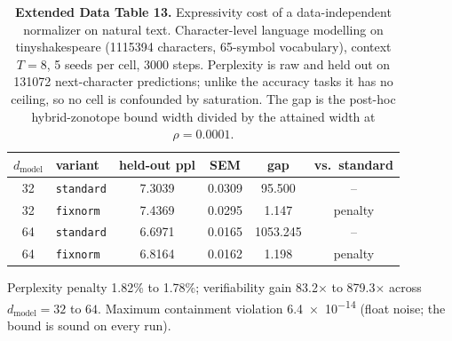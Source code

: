 \documentclass[sn-nature,pdflatex]{sn-jnl}
\begin{document}
\begin{table}[t]
\centering
\caption*{\textbf{Extended Data Table 13.} Expressivity cost of a data-independent normalizer on natural text. Character-level language modelling on tinyshakespeare (\num{1115394} characters, 65-symbol vocabulary), context $T=8$, 5 seeds per cell, 3000 steps. Perplexity is raw and held out on \num{131072} next-character predictions; unlike the accuracy tasks it has no ceiling, so no cell is confounded by saturation. The gap is the post-hoc hybrid-zonotope bound width divided by the attained width at $\rho=\num{0.0001}$.}
\label{edtab:language}
\begin{tabular}{S[table-format=2.0] l S[table-format=2.4] S[table-format=1.4] S[table-format=4.3] c}
\toprule
{$d_{\text{model}}$} & variant & {held-out ppl} & {SEM} & {gap} & {vs.\ standard} \\
 & \texttt{standard} & 7.3039 & 0.0309 & 95.500 & {--} \\
32 & \texttt{fixnorm} & 7.4369 & 0.0295 & 1.147 & penalty \\
64 & \texttt{standard} & 6.6971 & 0.0165 & 1053.245 & {--} \\
64 & \texttt{fixnorm} & 6.8164 & 0.0162 & 1.198 & penalty \\
\bottomrule
\end{tabular}
\par\vspace{2pt}\noindent\footnotesize Perplexity penalty \num{1.82}\% to \num{1.78}\%; verifiability gain \num{83.2}$\times$ to \num{879.3}$\times$ across $d_{\text{model}}=32$ to $64$. Maximum containment violation \num{6.4e-14} (float noise; the bound is sound on every run).
\end{table}
\end{document}
